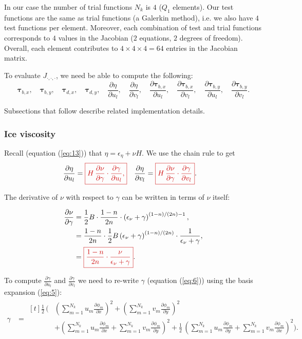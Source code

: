 \documentclass{amsart}
\newcommand{\diff}[2]{\ensuremath{\frac{\partial #1}{\partial #2}}}
\newcommand{\diffbasisexpansion}[3]{\ensuremath{\sum_{#3 = 1}^{N_k} {#1}_{#3} \diff{\phi_{#3}}{#2} }}
\newcommand{\UX}{\diffbasisexpansion{u}{x}{m}}
\newcommand{\UY}{\diffbasisexpansion{u}{y}{m}}
\newcommand{\VX}{\diffbasisexpansion{v}{x}{m}}
\newcommand{\VY}{\diffbasisexpansion{v}{y}{m}}
\newcommand{\basalshearstress}[1]{\boldsymbol{\tau}_{b#1}}
\newcommand{\taubx}{\basalshearstress{,x}}
\newcommand{\tauby}{\basalshearstress{,y}}
\newcommand{\drivingstress}[1]{\boldsymbol{\tau}_{d#1}}
\newcommand{\taudx}{\drivingstress{,x}}
\newcommand{\taudy}{\drivingstress{,y}}
\newcommand{\highlight}[1]{{\color{red!80!black} \fbox{$ \displaystyle #1 $} }}
\begin{document}
In our case the number of trial functions $N_k$ is $4$ ($Q_1$ elements). Our test functions are the same as trial functions (a Galerkin method), i.e. we also have $4$ test functions per element. Moreover, each combination of test and trial functions corresponds to $4$ values in the Jacobian ($2$ equations, $2$ degrees of freedom). Overall, each element contributes to $4 \times 4 \times 4 = 64$ entries in the Jacobian matrix.

To evaluate $J_{\cdot,\cdot,\cdot}$, we need be able to compute the following:
\begin{equation*}
    \taubx, \quad \tauby, \quad \taudx, \quad \taudy, \quad \diff{\eta}{u_l}, \quad \diff{\eta}{v_l}, \quad
    \diff{\taubx}{u_l}, \quad \diff{\taubx}{v_l}, \quad \diff{\tauby}{u_l}, \quad \diff{\tauby}{v_l}.
\end{equation*}

Subsections that follow describe related implementation details.


\subsubsection{Ice viscosity}
\label{sec:viscosity-evaluation}

Recall (equation (\ref{eq:13})) that $\eta = \epsilon_{\eta} + \nu H$. We use the chain rule to get
\begin{align*}
  \diff{\eta}{u_l} &= \highlight{ H\,\diff{\nu}{\gamma}\cdot \diff{\gamma}{u_l}, } &   \diff{\eta}{v_l} &= \highlight{ H\,\diff{\nu}{\gamma}\cdot \diff{\gamma}{v_l} }.
\end{align*}

The derivative of $\nu$ with respect to $\gamma$ can be written in terms of $\nu$ itself:

\begin{align*}
  \diff{\nu}{\gamma} & = \frac{1}{2} B \cdot \frac{1 - n}{2n} \cdot \left(\epsilon_{\nu} + \gamma \right)^{(1 - n) / (2n) - 1}, \\
      & = \frac{1 - n}{2n} \cdot \frac{1}{2} B \left( \epsilon_{\nu} + \gamma \right)^{(1 - n) / (2n)} \cdot \frac{1}{\epsilon_{\nu} + \gamma}, \\
      & = \highlight{ \frac{1 - n}{2n} \cdot \frac{\nu}{\epsilon_{\nu} + \gamma} }.
\end{align*}

To compute $\diff{\gamma}{u_l}$ and $\diff{\gamma}{v_l}$ we need to re-write $\gamma$ (equation (\ref{eq:6})) using the basis expansion (\ref{eq:5}):
\begin{align*}
  \gamma &=
           \begin{aligned}[t]
             \frac{1}{2}\, \Bigg(&\left(\UX\right)^2 + \left(\VY\right)^2 \\
             & + \left(\UX + \VY\right)^2 + \frac{1}{2}\, \left(\UY + \VX\right)^2\Bigg). \\
           \end{aligned}
\end{align*}
\end{document}

